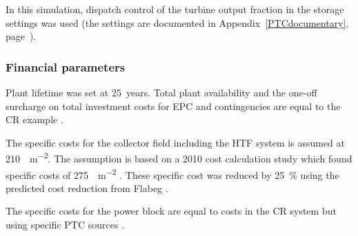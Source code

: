 In this simulation, dispatch control of the turbine output fraction in the storage settings was used (the settings are documented in Appendix~\ref{PTCdocumentary}, page~\pageref{PTC_turbineoutput}). 

\subsubsection{Financial parameters}
Plant lifetime was set at \SI{25}{years}. Total plant availability and the one-off surcharge on total investment costs for EPC and contingencies are equal to the CR example \cite{Platzer2014}.

The specific costs for the collector field including the HTF system is assumed at \SI{210}{\usd\per\square\metre}. The assumption is based on a 2010 cost calculation study which found specific costs of \SI{275}{\usd\per\square\metre} \cite{Morin2012}. These specific cost was reduced by \SI{25}{\percent} using the predicted cost reduction from Flabeg \cite{FLABEG_FE_GmbH2015}.

The specific costs for the power block are equal to costs in the CR system but using specific PTC sources \cite{Platzer2014}.


